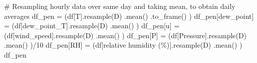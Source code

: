 \documentclass[
  letterpaper,
  DIV=11,
  numbers=noendperiod]{scrreprt}
\newenvironment{Shaded}{\begin{snugshade}}{\end{snugshade}}
\newcommand{\CommentTok}[1]{\textcolor[rgb]{0.37,0.37,0.37}{#1}}
\newcommand{\DecValTok}[1]{\textcolor[rgb]{0.68,0.00,0.00}{#1}}
\newcommand{\NormalTok}[1]{\textcolor[rgb]{0.00,0.23,0.31}{#1}}
\newcommand{\OperatorTok}[1]{\textcolor[rgb]{0.37,0.37,0.37}{#1}}
\newcommand{\StringTok}[1]{\textcolor[rgb]{0.13,0.47,0.30}{#1}}
\begin{document}
\begin{Shaded}
\begin{Highlighting}[]
\CommentTok{\# Resampling hourly data over same day and taking mean, to obtain daily averages}
\NormalTok{df\_pen }\OperatorTok{=}\NormalTok{ (df[}\StringTok{\textquotesingle{}T\textquotesingle{}}\NormalTok{].resample(}\StringTok{\textquotesingle{}D\textquotesingle{}}\NormalTok{)}
\NormalTok{                 .mean()}
\NormalTok{                 .to\_frame()}
\NormalTok{         )}
\NormalTok{df\_pen[}\StringTok{\textquotesingle{}dew\_point\textquotesingle{}}\NormalTok{] }\OperatorTok{=}\NormalTok{ (df[}\StringTok{\textquotesingle{}dew\_point\_T\textquotesingle{}}\NormalTok{].resample(}\StringTok{\textquotesingle{}D\textquotesingle{}}\NormalTok{)}
\NormalTok{                                        .mean()}
\NormalTok{                      )}
\NormalTok{df\_pen[}\StringTok{\textquotesingle{}u\textquotesingle{}}\NormalTok{] }\OperatorTok{=}\NormalTok{ (df[}\StringTok{\textquotesingle{}wind\_speed\textquotesingle{}}\NormalTok{].resample(}\StringTok{\textquotesingle{}D\textquotesingle{}}\NormalTok{)}
\NormalTok{                               .mean()}
\NormalTok{              )}
\NormalTok{df\_pen[}\StringTok{\textquotesingle{}P\textquotesingle{}}\NormalTok{] }\OperatorTok{=}\NormalTok{ (df[}\StringTok{\textquotesingle{}Pressure\textquotesingle{}}\NormalTok{].resample(}\StringTok{\textquotesingle{}D\textquotesingle{}}\NormalTok{)}
\NormalTok{                             .mean()}
\NormalTok{              )}\OperatorTok{/}\DecValTok{10}
\NormalTok{df\_pen[}\StringTok{\textquotesingle{}RH\textquotesingle{}}\NormalTok{] }\OperatorTok{=}\NormalTok{ (df[}\StringTok{\textquotesingle{}relative humidity (\%)\textquotesingle{}}\NormalTok{].resample(}\StringTok{\textquotesingle{}D\textquotesingle{}}\NormalTok{)}
\NormalTok{                                           .mean()}
\NormalTok{               )}
\NormalTok{df\_pen}
\end{Highlighting}
\end{Shaded}
\end{document}
